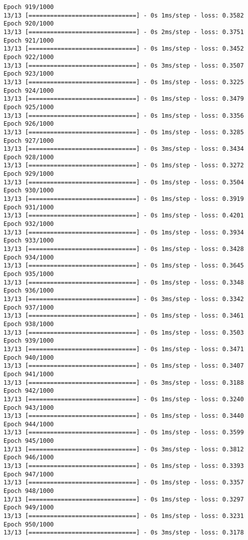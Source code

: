 \documentclass[11pt]{article}
\begin{document}
\begin{Verbatim}[commandchars=\\\{\}]
Epoch 919/1000
13/13 [==============================] - 0s 1ms/step - loss: 0.3582
Epoch 920/1000
13/13 [==============================] - 0s 2ms/step - loss: 0.3751
Epoch 921/1000
13/13 [==============================] - 0s 1ms/step - loss: 0.3452
Epoch 922/1000
13/13 [==============================] - 0s 3ms/step - loss: 0.3507
Epoch 923/1000
13/13 [==============================] - 0s 1ms/step - loss: 0.3225
Epoch 924/1000
13/13 [==============================] - 0s 1ms/step - loss: 0.3479
Epoch 925/1000
13/13 [==============================] - 0s 1ms/step - loss: 0.3356
Epoch 926/1000
13/13 [==============================] - 0s 1ms/step - loss: 0.3285
Epoch 927/1000
13/13 [==============================] - 0s 3ms/step - loss: 0.3434
Epoch 928/1000
13/13 [==============================] - 0s 1ms/step - loss: 0.3272
Epoch 929/1000
13/13 [==============================] - 0s 1ms/step - loss: 0.3504
Epoch 930/1000
13/13 [==============================] - 0s 1ms/step - loss: 0.3919
Epoch 931/1000
13/13 [==============================] - 0s 1ms/step - loss: 0.4201
Epoch 932/1000
13/13 [==============================] - 0s 1ms/step - loss: 0.3934
Epoch 933/1000
13/13 [==============================] - 0s 1ms/step - loss: 0.3428
Epoch 934/1000
13/13 [==============================] - 0s 1ms/step - loss: 0.3645
Epoch 935/1000
13/13 [==============================] - 0s 1ms/step - loss: 0.3348
Epoch 936/1000
13/13 [==============================] - 0s 3ms/step - loss: 0.3342
Epoch 937/1000
13/13 [==============================] - 0s 1ms/step - loss: 0.3461
Epoch 938/1000
13/13 [==============================] - 0s 1ms/step - loss: 0.3503
Epoch 939/1000
13/13 [==============================] - 0s 1ms/step - loss: 0.3471
Epoch 940/1000
13/13 [==============================] - 0s 1ms/step - loss: 0.3407
Epoch 941/1000
13/13 [==============================] - 0s 3ms/step - loss: 0.3188
Epoch 942/1000
13/13 [==============================] - 0s 1ms/step - loss: 0.3240
Epoch 943/1000
13/13 [==============================] - 0s 1ms/step - loss: 0.3440
Epoch 944/1000
13/13 [==============================] - 0s 1ms/step - loss: 0.3599
Epoch 945/1000
13/13 [==============================] - 0s 3ms/step - loss: 0.3812
Epoch 946/1000
13/13 [==============================] - 0s 1ms/step - loss: 0.3393
Epoch 947/1000
13/13 [==============================] - 0s 1ms/step - loss: 0.3357
Epoch 948/1000
13/13 [==============================] - 0s 1ms/step - loss: 0.3297
Epoch 949/1000
13/13 [==============================] - 0s 1ms/step - loss: 0.3231
Epoch 950/1000
13/13 [==============================] - 0s 3ms/step - loss: 0.3178

\end{Verbatim}
\end{document}
